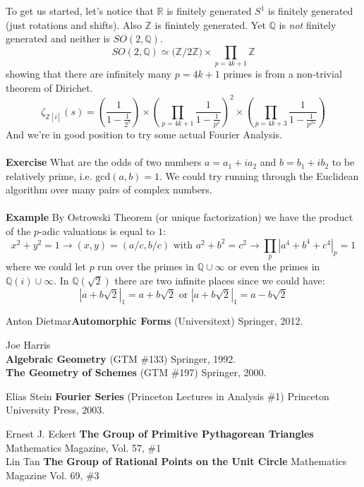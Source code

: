 \documentclass[12pt]{article}
\begin{document}
\newpage

\noindent To get us started, let's notice that $\mathbb{R}$ is finitely generated $S^1$ is finitely generated (just rotations and shifts).  Also $\mathbb{Z}$ is finintely generated. Yet $\mathbb{Q}$ is \textit{not} finitely generated and neither is $SO(2, \mathbb{Q})$. 
$$ SO(2, \mathbb{Q}) \simeq \big(\mathbb{Z}/2\mathbb{Z}\big)\times \prod_{p = 4k+1} \mathbb{Z}$$
showing that there are infinitely many $p = 4k+1$ primes is from a non-trivial theorem of Dirichet.\\ 
$$  \zeta_{\mathbb{Z}[i]}(s) = \left( \frac{1}{1 - \frac{1}{2^s}}\right)
\times \left( \prod_{p = 4k+1} \frac{1}{1 - \frac{1}{p^s}}\right)^2
\times \left( \prod_{p = 4k+3} \frac{1}{1 - \frac{1}{p^{2s}}}\right)$$
And we're in good position to try some actual Fourier Analysis. \\ \\
\textbf{Exercise} What are the odds of two numbers $a = a_1 + i a_2$ and $b = b_1 + i b_2$ to be relatively prime, i.e. $\text{gcd}(a,b) = 1$.  We could try running through the Euclidean algorithm over many pairs of complex numbers. \\ \\
\textbf{Example} By Ostrowski Theorem (or unique factorization) we have the product of the $p$-adic valuations is equal to $1$:
$$ x^2 + y^2 = 1 \to (x,y) = (a/c,b/c) \text{ with } a^2 + b^2 = c^2 \to \prod_p |a^4 + b^4 + c^4 |_p = 1 $$
where we could let $p$ run over the primes in $\mathbb{Q} \cup \infty$ or even the primes in $\mathbb{Q}(i) \cup \infty$.  In $\mathbb{Q}(\sqrt{2})$ there are two infinite places since we could have:
$$ |a + b \sqrt{2}|_1 = a + b \sqrt{2} \text{ or } |a + b \sqrt{2}|_1 = a - b \sqrt{2}$$

\vfill
\begin{thebibliography}{}

\item Anton Dietmar\textbf{Automorphic Forms} (Universitext)  Springer, 2012.

\item Joe Harris \\ 
\textbf{Algebraic Geometry} \hspace{0.52in}(GTM \#133)  Springer, 1992. \\
\textbf{The Geometry of Schemes} (GTM \#197) Springer, 2000.

\item Elias Stein \textbf{Fourier Series} (Princeton Lectures in Analysis \#1) Princeton University Press, 2003.

\item Ernest J. Eckert \textbf{The Group of Primitive Pythagorean Triangles} Mathematics Magazine, Vol. 57, \#1  \\
Lin Tan \textbf{The Group of Rational Points on the Unit Circle}  Mathematics Magazine Vol. 69, \#3  


\end{thebibliography}
\end{document}
